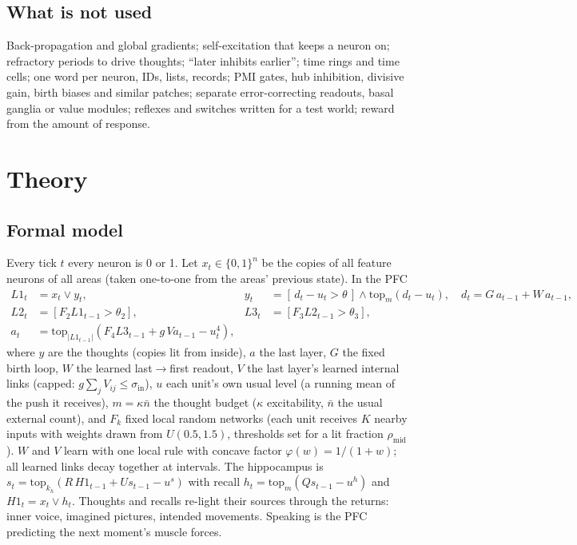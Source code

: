 \documentclass[11pt]{article}
\begin{document}
\subsection{What is not used}
Back-propagation and global gradients; self-excitation that keeps a neuron on; refractory periods to drive thoughts;
``later inhibits earlier''; time rings and time cells; one word per neuron, IDs, lists, records; PMI gates, hub
inhibition, divisive gain, birth biases and similar patches; separate error-correcting readouts, basal ganglia or value
modules; reflexes and switches written for a test world; reward from the amount of response.

\section{Theory}\label{sec:theory}

\subsection{Formal model}
Every tick $t$ every neuron is 0 or 1. Let $x_t\in\{0,1\}^n$ be the copies of all feature neurons of all areas (taken
one-to-one from the areas' previous state). In the PFC
\begin{align*}
L1_t &= x_t \lor y_t, & y_t &= [\,d_t-u_t>\theta\,]\land \mathrm{top}_m(d_t-u_t), \quad d_t = G\,a_{t-1}+W\,a_{t-1},\\
L2_t &= [F_2 L1_{t-1}>\theta_2], & L3_t &= [F_3 L2_{t-1}>\theta_3],\\
a_t &= \mathrm{top}_{|L1_{t-1}|}\!\left(F_4 L3_{t-1} + g\,V a_{t-1} - u^4_t\right),
\end{align*}
where $y$ are the thoughts (copies lit from inside), $a$ the last layer, $G$ the fixed birth loop, $W$ the learned
last$\to$first readout, $V$ the last layer's learned internal links (capped: $g\sum_j V_{ij}\le\sigma_\text{in}$), $u$ each
unit's own usual level (a running mean of the push it receives), $m=\kappa\bar n$ the thought budget ($\kappa$ excitability,
$\bar n$ the usual external count), and $F_k$ fixed local random networks (each unit receives $K$ nearby inputs with weights
drawn from $U(0.5,1.5)$, thresholds set for a lit fraction $\rho_\text{mid}$). $W$ and $V$ learn with one local rule with
concave factor $\varphi(w)=1/(1+w)$; all learned links decay together at intervals. The hippocampus is
$s_t=\mathrm{top}_{k_h}(R\,H1_{t-1}+U s_{t-1}-u^s)$ with recall $h_t=\mathrm{top}_m(Q s_{t-1}-u^h)$ and $H1_t = x_t\lor h_t$.
Thoughts and recalls re-light their sources through the returns: inner voice, imagined pictures, intended movements.
Speaking is the PFC predicting the next moment's muscle forces.
\end{document}
